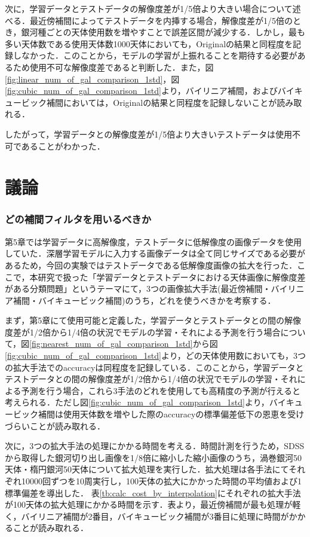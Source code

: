 \documentclass[a4j, 11pt]{jreport}
\begin{document}
次に，学習データとテストデータの解像度差が1/5倍より大きい場合について述べる．最近傍補間によってテストデータを内挿する場合，解像度差が1/5倍のとき，銀河種ごとの天体使用数を増やすことで誤差区間が減少する．しかし，最も多い天体数である使用天体数1000天体においても，Originalの結果と同程度を記録しなかった．このことから，モデルの学習が上振れることを期待する必要があるため使用不可な解像度差であると判断した．また，図\ref{fig:linear_num_of_gal_comparison_1std}，図\ref{fig:cubic_num_of_gal_comparison_1std}より，バイリニア補間，およびバイキュービック補間においては，Originalの結果と同程度を記録しないことが読み取れる．

したがって，学習データとの解像度差が1/5倍より大きいテストデータは使用不可であることがわかった．

\newpage
\section{議論}
\subsubsection{どの補間フィルタを用いるべきか}
第5章では学習データに高解像度，テストデータに低解像度の画像データを使用していた．深層学習モデルに入力する画像データは全て同じサイズである必要があるため，今回の実験ではテストデータである低解像度画像の拡大を行った．ここで，本研究で扱った「学習データとテストデータにおける天体画像に解像度差がある分類問題」というテーマにて，3つの画像拡大手法(最近傍補間・バイリニア補間・バイキュービック補間)のうち，どれを使うべきかを考察する．

まず，第5章にて使用可能と定義した，学習データとテストデータとの間の解像度差が1/2倍から1/4倍の状況でモデルの学習・それによる予測を行う場合について，図\ref{fig:nearest_num_of_gal_comparison_1std}から図\ref{fig:cubic_num_of_gal_comparison_1std}より，どの天体使用数においても，3つの拡大手法でのaccuracyは同程度を記録している．このことから，学習データとテストデータとの間の解像度差が1/2倍から1/4倍の状況でモデルの学習・それによる予測を行う場合，これら3手法のどれを使用しても高精度の予測が行えると考えられる．ただし図\ref{fig:cubic_num_of_gal_comparison_1std}より，バイキュービック補間は使用天体数を増やした際のaccuracyの標準偏差低下の恩恵を受けづらいことが読み取れる．

次に，3つの拡大手法の処理にかかる時間を考える．時間計測を行うため，SDSSから取得した銀河切り出し画像を1/8倍に縮小した縮小画像のうち，渦巻銀河50天体・楕円銀河50天体について拡大処理を実行した．拡大処理は各手法にてそれぞれ10000回ずつを10周実行し，100天体の拡大にかかった時間の平均値および1標準偏差を導出した．
表\ref{tb:calc_cost_by_interpolation}にそれぞれの拡大手法が100天体の拡大処理にかかる時間を示す．表より，最近傍補間が最も処理が軽く，バイリニア補間が2番目，バイキュービック補間が3番目に処理に時間がかかることが読み取れる．
\end{document}
